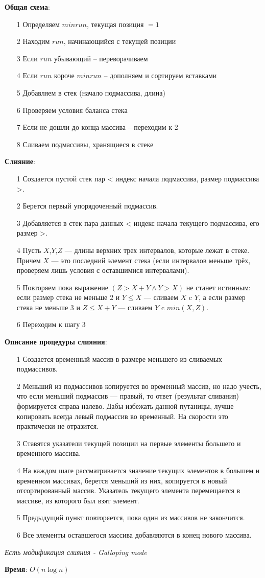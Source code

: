 \noindent\textbf{Общая схема}:
\begin{itemize}
    \item[1] Определяем $minrun$, текущая позиция $= 1$
    \item[2] Находим $run$, начинающийся с текущей позиции
	\item[3] Если $run$ убывающий \--- переворачиваем
	\item[4] Если $run$ короче $minrun$ \--- дополняем и сортируем вставками
	\item[5] Добавляем в стек (начало подмассива, длина)
	\item[6] Проверяем условия баланса стека 
	\item[7] Если не дошли до конца массива \--- переходим к 2
	\item[8] Сливаем подмассивы, хранящиеся в стеке
\end{itemize}

\noindent\textbf{Слияние}:
\begin{itemize}
    \item[1]  Создается пустой стек пар < индекс начала подмассива, размер подмассива >.
    \item[2] Берется первый упорядоченный подмассив.
	\item[3] Добавляется в стек пара данных < индекс начала текущего подмассива, его размер >.
	\item[4]  Пусть $X$,$Y$,$Z$ — длины верхних трех интервалов, которые лежат в стеке. Причем $X$ — это последний элемент стека (если интервалов меньше трёх, проверяем лишь условия с оставшимися интервалами).
	\item[5] Повторяем пока выражение $(Z>X+Y \wedge Y>X)$ не станет истинным: если размер стека не меньше 2 и $Y \leq X$ — сливаем $X$ c $Y$, а если размер стека не меньше 3 и $Z \leq X+Y$ — сливаем $Y$ c $min(X,Z)$. 
	\item[6]  Переходим к шагу 3 
\end{itemize}
	
\noindent\textbf{Описание процедуры слияния}:
\begin{itemize}
    \item[1]  Создается временный массив в размере меньшего из сливаемых подмассивов.
    \item[2]  Меньший из подмассивов копируется во временный массив, но надо учесть, что если меньший подмассив — правый, то ответ (результат сливания) формируется справа налево. Дабы избежать данной путаницы, лучше копировать всегда левый подмассив во временный. На скорости это практически не отразится. 
	\item[3] Ставятся указатели текущей позиции на первые элементы большего и временного массива.
	\item[4]  На каждом шаге рассматривается значение текущих элементов в большем и временном массивах, берется меньший из них, копируется в новый отсортированный массив. Указатель текущего элемента перемещается в массиве, из которого был взят элемент.
	\item[5] Предыдущий пункт повторяется, пока один из массивов не закончится.
	\item[6] Все элементы оставшегося массива добавляются в конец нового массива.
\end{itemize}

\noindent\textit{Есть модификация слияния - Galloping mode}

\noindent\textbf{Время}: $O(n \log n)$
